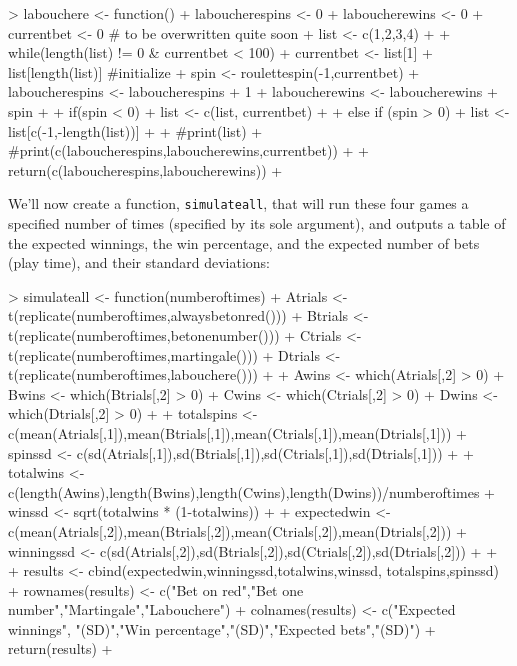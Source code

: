 \documentclass[10pt, oneside, reqno]{article}
\theoremstyle{plain}
\begin{document}
\begin{Schunk}
\begin{Sinput}
> labouchere <- function(){
+ 	laboucherespins <- 0
+ 	laboucherewins <- 0
+ 	currentbet <- 0 # to be overwritten quite soon
+ 	list <- c(1,2,3,4)
+ 	
+ 	while(length(list) != 0 & currentbet < 100){
+ 		currentbet <- list[1] + list[length(list)] #initialize
+ 		spin <- roulettespin(-1,currentbet)
+ 		laboucherespins <- laboucherespins + 1
+ 		laboucherewins <- laboucherewins + spin
+ 		
+ 		if(spin < 0){
+ 			list <- c(list, currentbet)}
+ 			
+ 		else if (spin > 0){
+ 			list <- list[c(-1,-length(list))]}
+ 		
+ 		#print(list)
+ 		#print(c(laboucherespins,laboucherewins,currentbet))
+ 		}
+ 	return(c(laboucherespins,laboucherewins))
+ 	}
\end{Sinput}
\end{Schunk}

We'll now create a function, {\tt simulateall}, that will run these four games a specified number of times (specified by its sole argument), and outputs a table of the expected winnings, the win percentage, and the expected number of bets (play time), and their standard deviations:

\begin{Schunk}
\begin{Sinput}
> simulateall <- function(numberoftimes){
+ 	Atrials <- t(replicate(numberoftimes,alwaysbetonred()))
+ 	Btrials <- t(replicate(numberoftimes,betonenumber()))
+ 	Ctrials <- t(replicate(numberoftimes,martingale()))
+ 	Dtrials <- t(replicate(numberoftimes,labouchere()))
+ 	
+ 	Awins <- which(Atrials[,2] > 0)
+ 	Bwins <- which(Btrials[,2] > 0)
+ 	Cwins <- which(Ctrials[,2] > 0)
+ 	Dwins <- which(Dtrials[,2] > 0)
+ 		
+ 	totalspins <- c(mean(Atrials[,1]),mean(Btrials[,1]),mean(Ctrials[,1]),mean(Dtrials[,1]))
+ 	spinssd <- c(sd(Atrials[,1]),sd(Btrials[,1]),sd(Ctrials[,1]),sd(Dtrials[,1]))
+ 	
+ 	totalwins <- c(length(Awins),length(Bwins),length(Cwins),length(Dwins))/numberoftimes
+ 	winssd <- sqrt(totalwins * (1-totalwins))
+ 		
+ 	expectedwin <- c(mean(Atrials[,2]),mean(Btrials[,2]),mean(Ctrials[,2]),mean(Dtrials[,2]))
+ 	winningssd <- c(sd(Atrials[,2]),sd(Btrials[,2]),sd(Ctrials[,2]),sd(Dtrials[,2]))
+ 	
+ 	
+ 	results <- cbind(expectedwin,winningssd,totalwins,winssd, totalspins,spinssd)
+ 	rownames(results) <- c("Bet on red","Bet one number","Martingale","Labouchere")
+ 	colnames(results) <- c("Expected winnings", "(SD)","Win percentage","(SD)","Expected bets","(SD)")
+ 	return(results)
+ 	}
\end{Sinput}
\end{Schunk}
\end{document}
